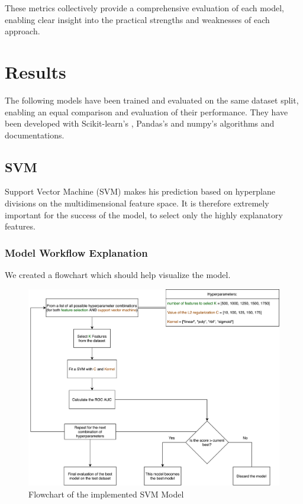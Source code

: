 \documentclass{article}
\begin{document}
These metrics collectively provide a comprehensive evaluation of each model, enabling clear insight into the practical strengths and weaknesses of each approach.

\section{Results}

The following models have been trained and evaluated on the same dataset split, enabling an equal comparison and evaluation of their performance. They have been developed with Scikit-learn's \citep{scikit-learn}, Pandas's \citep{pandas} and numpy's \citep{numpy} algorithms and documentations. 

\subsection{SVM}

Support Vector Machine (SVM) makes his prediction based on hyperplane divisions on the multidimensional feature space. It is therefore extremely important for the success of the model, to select only the highly explanatory features. 

\subsubsection{Model Workflow Explanation}

We created a flowchart which should help visualize the model.

\begin{figure}[h]
	\centering
	\includegraphics[width=1.0\textwidth]{FlowChart.png}
	 \vspace{0em}
	\caption{Flowchart of the implemented SVM Model}
\end{figure}
\end{document}
